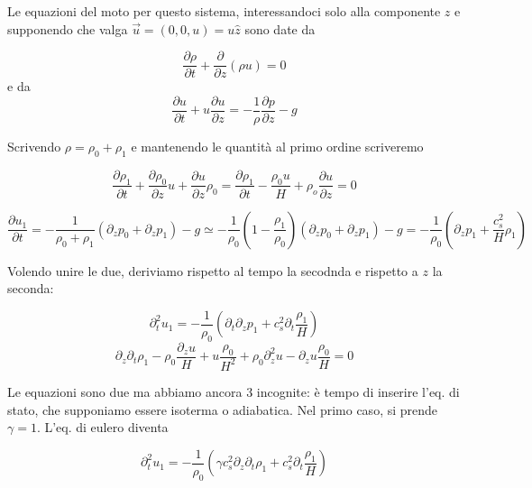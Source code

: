 \documentclass{report}
\begin{document}
Le equazioni del moto per questo sistema, interessandoci solo alla componente $z$ e supponendo che valga $\vec{u} = (0, 0, u) = u\hat{z}$ sono date da 

\begin{equation}
    \frac{\partial \rho}{\partial t} + \frac{\partial}{\partial z}(\rho u) = 0 
\end{equation}
e da 
\begin{equation}
    \frac{\partial u}{\partial t} + u\frac{\partial u}{\partial z} = -\frac{1}{\rho}\frac{\partial p}{\partial z} - g
\end{equation}

Scrivendo $\rho = \rho_0 + \rho_1$ e mantenendo le quantità al primo ordine scriveremo

\begin{equation}
    \frac{\partial \rho_1}{\partial t} + \frac{\partial \rho_0}{\partial z}u + \frac{\partial u}{\partial z}\rho_0 = \frac{\partial \rho_1}{\partial t} -\frac{\rho_0 u}{H} + \rho_o \frac{\partial u}{\partial z} = 0
\end{equation}

\begin{equation}
    \frac{\partial u_1}{\partial t} = -\frac{1}{\rho_0 + \rho_1}\left(\partial_z p_0 + \partial_z p_1\right) - g \simeq -\frac{1}{\rho_0}\left(1 - \frac{\rho_1}{\rho_0} \right)(\partial_z p_0 + \partial_zp_1) - g = -\frac{1}{\rho_0}\left(\partial_z p_1 + \frac{c_s^2}{H}\rho_1\right)
\end{equation}

Volendo unire le due, deriviamo rispetto al tempo la secodnda e rispetto a $z$ la seconda: 

\begin{equation}
    \partial_t^2 u_1 = -\frac{1}{\rho_0}(\partial_t\partial_z p_1 + c_s^2 \partial_t\frac{\rho_1}{H})
\end{equation}
\begin{equation}
    \partial_z\partial_t \rho_1 - \rho_0 \frac{\partial_z u}{H} + u \frac{\rho_0}{H^2} + \rho_0 \partial^2_z u - \partial_z u \frac{\rho_0}{H} = 0
\end{equation}

Le equazioni sono due ma abbiamo ancora 3 incognite: è tempo di inserire l'eq. di stato, che supponiamo essere isoterma o adiabatica. Nel primo caso, si prende $\gamma = 1$. L'eq. di eulero diventa

\begin{equation}
    \partial^2_t u_1 = -\frac{1}{\rho_0}\left(\gamma c_s^2 \partial_z\partial_t \rho_1 + c_s^2 \partial_t \frac{\rho_1}{H}\right)
\end{equation}
\end{document}
